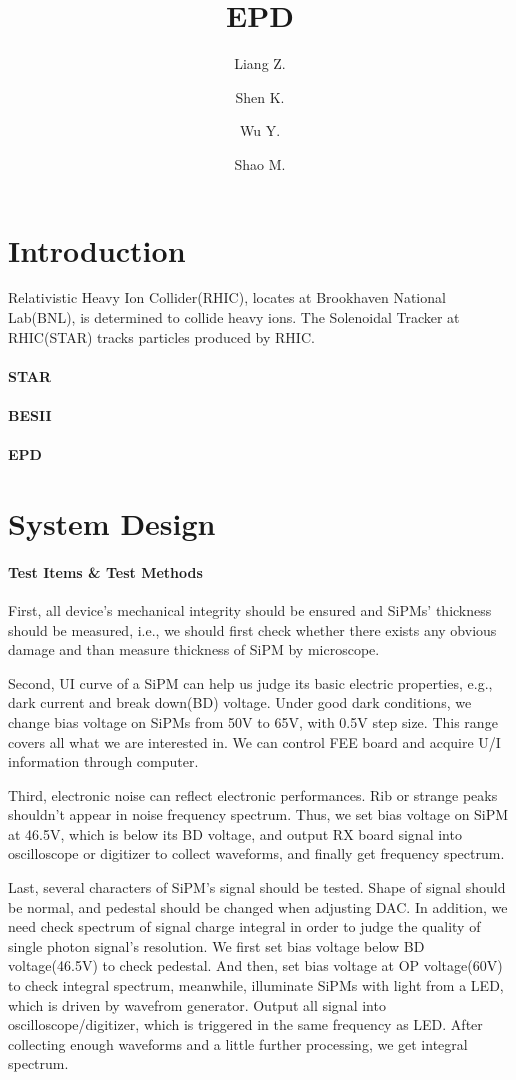 \documentclass[11pt,a4paper]{article}
\title{EPD}
\author[a]{Liang Z.}
\author[a]{Shen K.}
\author[a]{Wu Y.}
\author[a]{Shao M.}
\affiliation[a]{University of Science and Technology of China, JinZhai Road, HEFEI, China}
\begin{document}
\maketitle
\flushbottom

\section{Introduction}
Relativistic Heavy Ion Collider(RHIC), locates at Brookhaven National Lab(BNL), 
is determined to collide heavy ions. The Solenoidal Tracker at RHIC(STAR) tracks
particles produced by RHIC.
\paragraph{STAR}
\paragraph{BESII}
\paragraph{EPD}

\section{System Design}
\paragraph{Test Items \& Test Methods}First, all device's mechanical integrity should be ensured and SiPMs' thickness should be measured,
i.e., we should first check whether there exists any obvious damage and than measure thickness of SiPM by microscope.

Second, UI curve of a SiPM can help us judge its basic electric properties, e.g., dark current and break down(BD) voltage.
Under good dark conditions, we change bias voltage on SiPMs from 50V to 65V, with 0.5V step size. This range covers all what we are interested in.
We can control FEE board and acquire U/I information through computer.

Third, electronic noise can reflect electronic performances. Rib or strange peaks shouldn't appear in noise frequency spectrum. Thus, we set bias voltage on
SiPM at 46.5V, which is below its BD voltage, and output RX board signal into oscilloscope or digitizer to collect waveforms, and finally get frequency spectrum.

Last, several characters of SiPM's signal should be tested. Shape of signal should be normal, and pedestal should be changed when adjusting DAC. In addition, we need check
spectrum of signal charge integral in order to judge the quality of single photon signal's resolution. We first set bias voltage below BD voltage(46.5V) to check pedestal. And
then, set bias voltage at OP voltage(60V) to check integral spectrum, meanwhile, illuminate SiPMs with light from a LED, which is driven by wavefrom generator. Output all signal
into oscilloscope/digitizer, which is triggered in the same frequency as LED. After collecting enough waveforms and a little further processing, we get integral spectrum.
\end{document}
